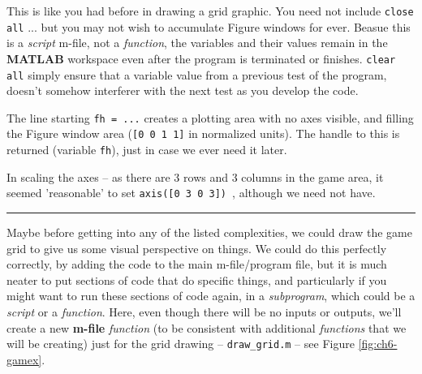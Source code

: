 \documentclass{tufte-book} %
\begin{document}
This is like you had before  in drawing a grid graphic. You need  not include \texttt{close \textcolor[rgb]{1,0,1}{all}} ... but you may not wish to accumulate \textsf{Figure windows} for ever. Beasue this is a \textit{script} \textsf{m-file}, not a \textit{function}, the variables and their values remain in the \textbf{MATLAB} workspace even after the program is terminated or finishes. \texttt{clear all} simply ensure that  a variable value from a previous test of the program, doesn't somehow interferer with the next test as you develop the code.

The line starting \texttt{fh = ...} creates a plotting area with no axes visible, and filling the Figure window area (\texttt{[0 0 1 1]} in normalized units). The handle to this is returned (variable \texttt{fh}), just in case we ever need it later.

In scaling the axes -- as there are 3 rows and 3 columns in the game area, it seemed 'reasonable' to set \texttt{axis([0 3 0 3]) }, although we need not have.

\vspace{1mm}
\noindent\rule{4cm}{0.5pt}
\vspace{2mm}

\noindent Maybe before getting into any of the listed complexities, we could draw the game grid to give us some visual perspective on things. We could do this perfectly correctly, by adding the code to the main \textsf{m-file}/program file, but it is much neater to put sections of code that do specific things, and particularly if you might want to run these sections of code again, in a \textit{subprogram}, which could be a \textit{script} or a \textit{function}. Here, even though there will be no inputs or outputs, we'll create a new \textbf{m-file }\textit{function} (to be consistent with additional \textit{functions} that we will be creating) just for the grid drawing -- \texttt{draw\_grid.m} -- see Figure \ref{fig:ch6-gamex}.
\end{document}
